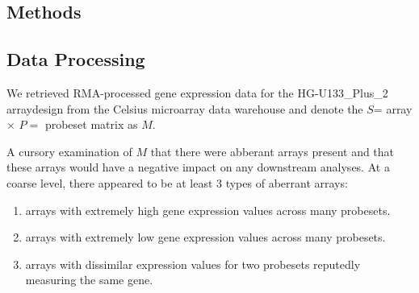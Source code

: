 \documentclass{bioinfo}
\begin{document}
\begin{methods}
\section{Methods}


\subsection{Data Processing}\label{Processing}

We retrieved RMA-processed gene expression data for the HG-U133\_Plus\_2
arraydesign from the Celsius microarray data warehouse \cite{rma,celsius} and
denote the $S$= array $\times$ $P=$ probeset matrix
as $M$. %


A cursory examination of $M$ that there were abberant arrays present and that
these arrays would have a negative impact on any downstream analyses.  At a
coarse level, there appeared to be at least 3 types of aberrant arrays:

\renewcommand{\labelenumi}{\Alph{enumi}.}
\begin{enumerate}
\item arrays with extremely high gene expression values across many probesets.
\item arrays with extremely low gene expression values across many probesets.
\item arrays with dissimilar expression values for two probesets reputedly
measuring the same gene.
\end{enumerate}


\end{methods}
\end{document}
